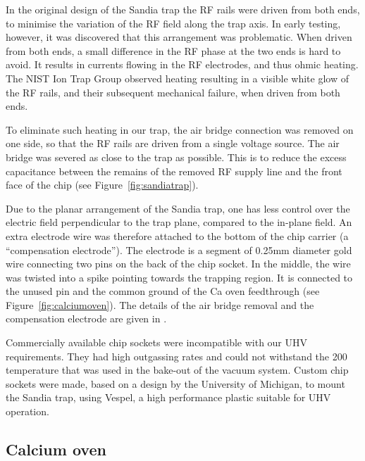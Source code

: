 In the original design of the Sandia trap the RF rails were driven from both ends, to minimise the variation of the RF field along the trap axis. In early testing, however, it was discovered that this arrangement was problematic. When driven from both ends, a small difference in the RF phase at the two ends is hard to avoid. It results in currents flowing in the RF electrodes, and thus ohmic heating. The NIST Ion Trap Group observed heating resulting in a visible white glow of the RF rails, and their subsequent mechanical failure, when driven from both ends.

To eliminate such heating in our trap, the air bridge connection was removed on one side, so that the RF rails are driven from a single voltage source. The air bridge was severed as close to the trap as possible. This is to reduce the excess capacitance between the remains of the removed RF supply line and the front face of the chip (see Figure~\ref{fig:sandiatrap}).

Due to the planar arrangement of the Sandia trap, one has less control over the electric field perpendicular to the trap plane, compared to the in-plane field. An extra electrode wire was therefore attached to the bottom of the chip carrier (a ``compensation electrode''). The electrode is a segment of 0.25mm diameter gold wire connecting two pins on the back of the chip socket. In the middle, the wire was twisted into a spike pointing towards the trapping region. It is connected to the unused pin and the common ground of the Ca oven feedthrough (see Figure~\ref{fig:calciumoven}). The details of the air bridge removal and the compensation electrode are given in \cite{Curtis2007}.

Commercially available chip sockets were incompatible with our UHV requirements. They had high outgassing rates and could not withstand the 200\degC\, temperature that was used in the bake-out of the vacuum system. Custom chip sockets were made, based on a design by the University of Michigan, to mount the Sandia trap, using Vespel, a high performance plastic suitable for UHV operation. 

\subsection{Calcium oven}
\label{subsec:oven}

